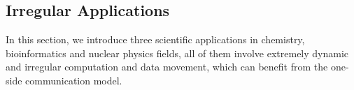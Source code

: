 







\subsection{Irregular Applications}
In this section, we introduce three scientific applications in chemistry,
bioinformatics and nuclear physics fields, all of them involve extremely
dynamic and irregular computation and data movement, which can benefit
from the one-side communication model.


